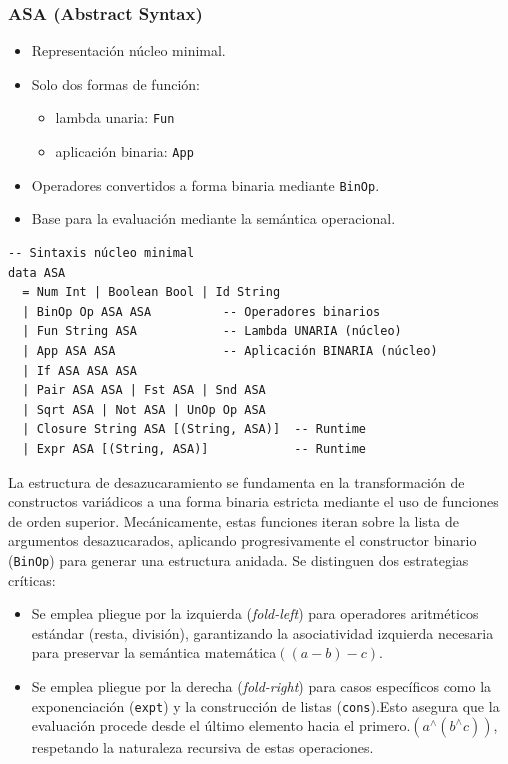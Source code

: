 \documentclass[a4paper,12pt]{article}
\begin{document}
\begin{tcolorbox}[title= Corrección: Desugar modulo A4, breakable]
\subsubsection*{ASA (Abstract Syntax)}
\begin{itemize}
    \item Representación núcleo minimal.
    \item Solo dos formas de función:
    \begin{itemize}
        \item lambda unaria: \texttt{Fun}
        \item aplicación binaria: \texttt{App}
    \end{itemize}
    \item Operadores convertidos a forma binaria mediante \texttt{BinOp}.
    \item Base para la evaluación mediante la semántica operacional.
\end{itemize}

\begin{verbatim}
-- Sintaxis núcleo minimal
data ASA
  = Num Int | Boolean Bool | Id String
  | BinOp Op ASA ASA          -- Operadores binarios
  | Fun String ASA            -- Lambda UNARIA (núcleo)
  | App ASA ASA               -- Aplicación BINARIA (núcleo)
  | If ASA ASA ASA
  | Pair ASA ASA | Fst ASA | Snd ASA
  | Sqrt ASA | Not ASA | UnOp Op ASA
  | Closure String ASA [(String, ASA)]  -- Runtime
  | Expr ASA [(String, ASA)]            -- Runtime
\end{verbatim}

\vspace{0,5 cm}

\vspace{0,5 cm}\textbf{} La estructura de desazucaramiento se fundamenta en la transformación de constructos variádicos a una forma binaria estricta mediante el uso de funciones de orden superior. Mecánicamente, estas funciones iteran sobre la lista de argumentos desazucarados, aplicando progresivamente el constructor binario (\texttt{BinOp}) para generar una estructura anidada. Se distinguen dos estrategias críticas:\begin{itemize} \item Se emplea pliegue por la izquierda (\textit{fold-left}) para operadores aritméticos estándar (resta, división), garantizando la asociatividad izquierda necesaria para preservar la semántica matemática$((a - b) - c)$. \item Se emplea pliegue por la derecha (\textit{fold-right}) para casos específicos como la exponenciación (\texttt{expt}) y la construcción de listas (\texttt{cons}).Esto asegura que la evaluación procede desde el último elemento hacia el primero.$(a^{\wedge}(b^{\wedge}c))$, respetando la naturaleza recursiva de estas operaciones. \end{itemize}



\end{tcolorbox}
\end{document}
